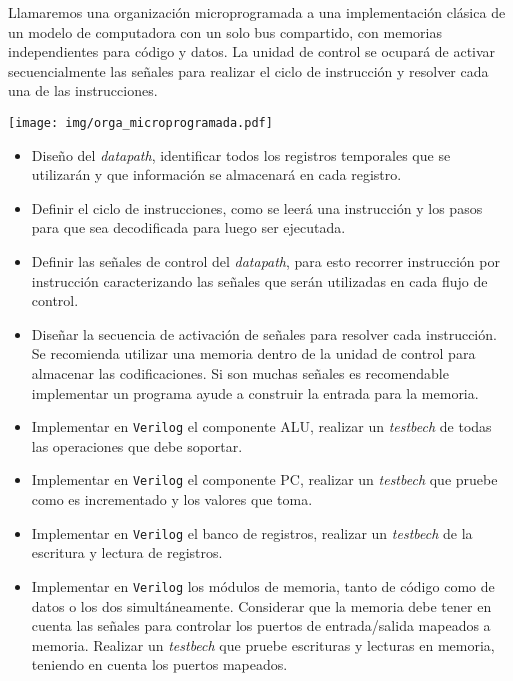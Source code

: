 \documentclass[a4paper,11pt]{article}
\begin{document}
Llamaremos una organización microprogramada a una implementación clásica de un modelo de computadora con un solo bus compartido, con memorias independientes para código y datos.
La unidad de control se ocupará de activar secuencialmente las señales para realizar el ciclo de instrucción y resolver cada una de las instrucciones.

\begin{center}
\texttt{[image: img/orga\_microprogramada.pdf]}
\end{center}

\begin{itemize}
 \item Diseño del \emph{datapath}, identificar todos los registros temporales que se utilizarán y que información se almacenará en cada registro.
 
 \item Definir el ciclo de instrucciones, como se leerá una instrucción y los pasos para que sea decodificada para luego ser ejecutada.
 
 \item Definir las señales de control del \emph{datapath}, para esto recorrer instrucción por instrucción caracterizando las señales que serán utilizadas en cada flujo de control.
 
 \item Diseñar la secuencia de activación de señales para resolver cada instrucción. Se recomienda utilizar una memoria dentro de la unidad de control para almacenar las codificaciones.
 Si son muchas señales es recomendable implementar un programa ayude a construir la entrada para la memoria.
 
 \item Implementar en \texttt{Verilog} el componente ALU, realizar un \emph{testbech} de todas las operaciones que debe soportar.
 
 \item Implementar en \texttt{Verilog} el componente PC, realizar un \emph{testbech} que pruebe como es incrementado y los valores que toma.
 
 \item Implementar en \texttt{Verilog} el banco de registros, realizar un \emph{testbech} de la escritura y lectura de registros.
 
 \item Implementar en \texttt{Verilog} los módulos de memoria, tanto de código como de datos o los dos simultáneamente. Considerar que la memoria debe tener en cuenta las señales para controlar los puertos de entrada/salida mapeados a memoria. Realizar un \emph{testbech} que pruebe escrituras y lecturas en memoria, teniendo en cuenta los puertos mapeados.
 

\end{itemize}
\end{document}
